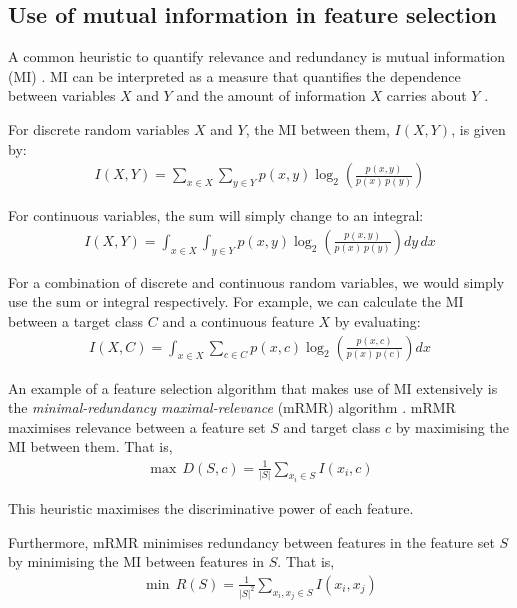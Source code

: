 \documentclass[12pt, twoside, a4paper]{report}
\begin{document}
\subsection{Use of mutual information in feature selection} \label{bg:fs:mi}

A common heuristic to quantify relevance and redundancy is mutual information (MI) \cite{RefWorks:98}. MI can be interpreted as a measure that quantifies the dependence between variables $X$ and $Y$ \cite{RefWorks:180} and the amount of information $X$ carries about $Y$ \cite{RefWorks:181}. 

For discrete random variables $X$ and $Y$, the MI between them, $I(X, Y)$, is given by:
\begin{align} \label{bg:fs:mi:dis}
I(X, Y) = \sum_{x \in X} \sum_{y \in Y} p(x, y) \log_2 \left(\frac{p(x, y)}{p(x) \, p(y)} \right) 
\end{align}

For continuous variables, the sum will simply change to an integral:
\begin{align} \label{bg:fs:mi:cont}
I(X, Y) = \int_{x \in X} \int_{y \in Y} p(x, y) \log_2 \left( \frac{p(x, y)}{p(x) \, p(y)} \right) dy \, dx
\end{align}

For a combination of discrete and continuous random variables, we would simply use the sum or integral respectively. For example, we can calculate the MI between a target class $C$ and a continuous feature $X$ by evaluating:
\begin{align*} %
I(X, C) = \int_{x \in X} \sum_{c \in C} p(x, c) \log_2 \left( \frac{p(x, c)}{p(x) \, p(c)} \right) dx
\end{align*}

An example of a feature selection algorithm that makes use of MI extensively is the \textit{minimal-redundancy maximal-relevance} (mRMR) algorithm \cite{RefWorks:182}. mRMR maximises relevance between a feature set $S$ and target class $c$ by maximising the MI between them. That is,
\begin{align*}
\max \, D(S, c) = \frac{1}{|S|} \sum_{x_i \in S} I(x_i, c)
\end{align*}

This heuristic maximises the discriminative power of each feature.

Furthermore, mRMR minimises redundancy between features in the feature set $S$ by minimising the MI between features in $S$. That is,
\begin{align*}
\min \, R(S) = \frac{1}{|S|^2} \sum_{x_i, x_j \in S} I(x_i, x_j)
\end{align*}
\end{document}
